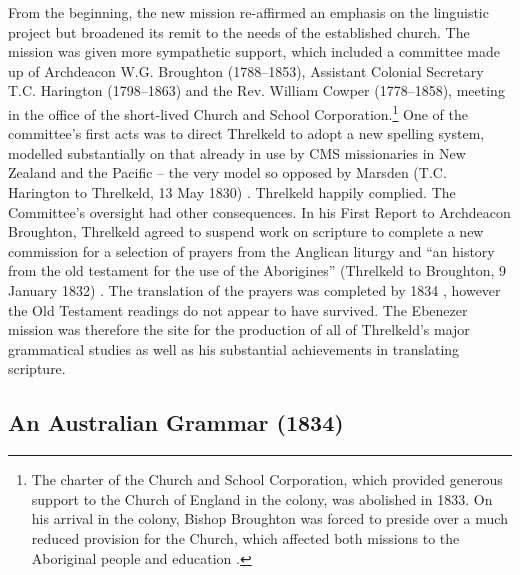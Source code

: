 {From the beginning, the new mission re-affirmed an emphasis on the linguistic project but broadened its remit to the needs of the established church. The mission was given more sympathetic support, which included a committee made up of Archdeacon W.G. Broughton (1788--1853), Assistant Colonial Secretary T.C. Harington (1798--1863) and the Rev. William Cowper (1778--1858), meeting in the office of the short-lived Church and School Corporation.\footnote{The charter of the Church and School Corporation, which provided generous support to the Church of England in the colony, was abolished in 1833. On his arrival in the colony, Bishop Broughton was forced to preside over a much reduced provision for the Church, which affected both missions to the Aboriginal people and education \citep[57--58]{kaye_conflict_2009}.} One of the committee’s first acts was to direct Threlkeld to adopt a new spelling system, modelled substantially on that already in use by CMS missionaries in New Zealand and the Pacific -- the very model so opposed by Marsden (T.C. Harington to Threlkeld, 13 May 1830) \citep[252--253]{gunson_australian_1974b}. Threlkeld happily complied. The Committee’s oversight had other consequences. In his First Report to Archdeacon Broughton, Threlkeld agreed to suspend work on scripture to complete a new commission for a selection of prayers from the Anglican liturgy and “an history from the old testament for the use of the Aborigines” (Threlkeld to Broughton, 9 January 1832) \citep[115]{gunson_australian_1974a}. The translation of the prayers was completed by 1834 \citep{threlkeld_selection_1834}, however the Old Testament readings do not appear to have survived. The Ebenezer mission was therefore the site for the production of all of Threlkeld’s major grammatical studies as well as his substantial achievements in translating scripture.

\subsection{An Australian Grammar (1834)}

}
